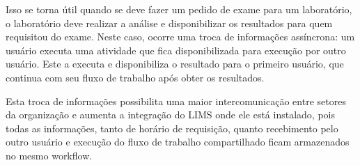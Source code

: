Isso se torna útil quando se deve fazer um pedido de exame para um laboratório, o laboratório deve realizar a análise e disponibilizar os resultados para quem requisitou do exame. Neste caso, ocorre uma troca de informações assíncrona: um usuário executa uma atividade que fica disponibilizada para execução por outro usuário. Este a executa e disponibiliza o resultado para o primeiro usuário, que continua com seu fluxo de trabalho após obter os resultados.

Esta troca de informações possibilita uma maior intercomunicação entre setores da organização e aumenta a integração do LIMS onde ele está instalado, pois todas as informações, tanto de horário de requisição, quanto recebimento pelo outro usuário e execução do fluxo de trabalho compartilhado ficam armazenados no mesmo workflow.